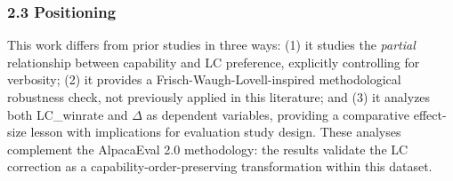 \subsubsection{2.3 Positioning}

This work differs from prior studies in three ways: (1) it studies the \textit{partial} relationship between capability and LC preference, explicitly controlling for verbosity; (2) it provides a Frisch-Waugh-Lovell-inspired methodological robustness check, not previously applied in this literature; and (3) it analyzes both LC\_winrate and $\Delta$ as dependent variables, providing a comparative effect-size lesson with implications for evaluation study design. These analyses complement the AlpacaEval 2.0 methodology: the results validate the LC correction as a capability-order-preserving transformation within this dataset.

